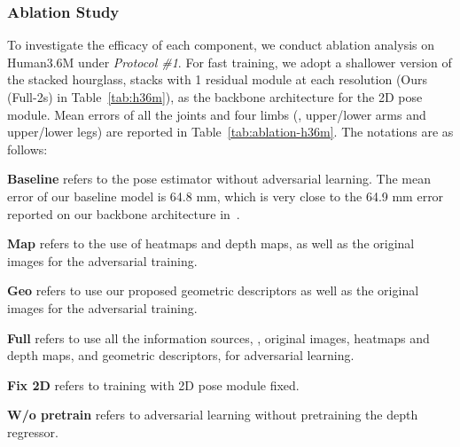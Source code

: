 \documentclass[10pt,twocolumn,letterpaper]{article}
\newenvironment{myitemize}[1][]{
	\begin{list}{{#1}} 
		{
			\setlength{\leftmargin}{1.2em}
			\setlength{\topsep}{0em}
			\setlength{\itemsep}{-0.2em}
	}}
{\end{list}}
\begin{document}
\subsubsection{Ablation Study} 
To investigate the efficacy of each component, we conduct ablation analysis on Human3.6M under \textit{Protocol \#1}. 
For fast training, we adopt a shallower version of the stacked hourglass,  stacks with 1 residual module at each resolution  (Ours (Full-2s) in Table~\ref{tab:h36m}), as the backbone architecture for the 2D pose module.  
Mean errors of all the joints and four limbs (\ie, upper/lower arms and upper/lower legs) are reported in Table~\ref{tab:ablation-h36m}. 
The notations are as follows:
\begin{myitemize}
	\item[] \textbf{Baseline} refers to the pose estimator without adversarial learning. The mean error of our baseline model is 64.8 mm, which is very close to the 64.9 mm error reported on our backbone architecture in~\cite{zhou2017towards}.  
\item[] \textbf{Map} refers to the use of heatmaps and depth maps, as well as the original images for the adversarial training. 
	\item[] \textbf{Geo} refers to use our proposed geometric descriptors as well as the original images for the adversarial training.
	\item[] \textbf{Full} refers to use all the information sources, \ie, original images, heatmaps and depth maps, and geometric descriptors, for adversarial learning.  
	\item[] \textbf{Fix 2D} refers to training with 2D pose  module fixed. 
	\item[] \textbf{W/o pretrain} refers to adversarial learning without pretraining the depth regressor. 
\end{myitemize}
\end{document}
